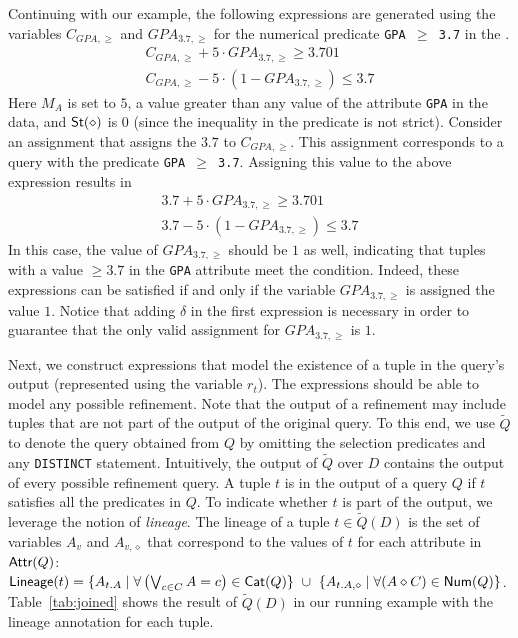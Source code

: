 \begin{example}
\label{ex:numeric_constraint}
Continuing with our example, the following expressions are generated using the variables $C_{GPA, \geq}$ and $GPA_{3.7, \geq}$ for the numerical predicate {\tt GPA $\geq$ 3.7} in the \running{}.
\begin{align*}
    C_{GPA, \geq} + 5 \cdot GPA_{3.7, \geq} \geq 3.701 \\ 
    C_{GPA, \geq} - 5 \cdot (1 - GPA_{3.7, \geq}) \leq 3.7
\end{align*}
Here $M_A$ is set to $5$, a value greater than any value of the attribute {\tt GPA} in the data, and ${\sf St}(\diamond)$ is $0$ (since the inequality in the predicate is not strict). Consider an assignment that assigns the $3.7$ to $C_{GPA, \geq}$. This assignment corresponds to a query with the predicate {\tt GPA $\geq$ 3.7}. Assigning this value to the above expression results in 
\begin{align*}
    3.7 + 5 \cdot GPA_{3.7, \geq} \geq 3.701 \\ 
    3.7 - 5 \cdot (1 - GPA_{3.7, \geq}) \leq 3.7
\end{align*}
In this case, the value of $GPA_{3.7, \geq}$ should be $1$ as well, indicating that tuples with a value $\geq 3.7$ in the {\tt GPA} attribute meet the condition. Indeed, these expressions can be satisfied if and only if the variable $GPA_{3.7, \geq}$ is assigned the value $1$. Notice that adding $\delta$ in the first expression is necessary in order to guarantee that the only valid assignment for $GPA_{3.7, \geq}$ is $1$. 



\end{example}













Next, we construct expressions that model the existence of a tuple in the query's output (represented using the variable $r_t$). The expressions should be able to model any possible refinement. Note that the output of a refinement may include tuples that are not part of the output of the original query. To this end, we use $\widetilde{Q}$ to denote the query obtained from $Q$ by omitting the selection predicates and any {\tt DISTINCT} statement. Intuitively, the output of $\widetilde{Q}$ over $D$ contains the output of every possible refinement query. A tuple $t$ is in the output of a query $Q$ if $t$ satisfies all the predicates in $Q$. 
To indicate whether $t$ is part of the output, we leverage the notion of {\it lineage}. The lineage of a tuple $t\in\widetilde{Q}(D)$ is the set of variables $A_v$ and $A_{v, \diamond}$ that correspond to the values of $t$ for each attribute in $\textsf{Attr}(Q)$: $\textsf{Lineage}(t)=\{A_{t.A} \mid \forall \left( \bigvee_{c \in C} A = c \right) \in \textsf{Cat}(Q)\}~ \cup~ \{A_{t.A, \diamond} \mid \forall (A \diamond C) \in \textsf{Num}(Q)\}$. Table~\ref{tab:joined} shows the result of $\widetilde{Q}(D)$ in our running example with the lineage annotation for each tuple.


